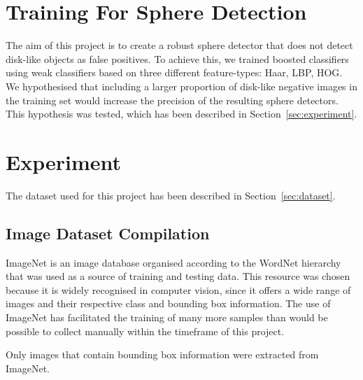 \documentclass{llncs}
\begin{document}
	\section{Training For Sphere Detection} {

		The aim of this project is to create a robust sphere detector that does not detect disk-like objects as false positives. To achieve this, we trained boosted classifiers using weak classifiers based on three different feature-types: Haar, LBP, HOG. We hypothesised that including a larger proportion of disk-like negative images in the training set would increase the precision of the resulting sphere detectors. This hypothesis was tested, which has been described in Section~\ref{sec:experiment}.

	}

	\section{Experiment} {
	\label{sec:experiment}


		The dataset used for this project has been described in Section~\ref{sec:dataset}.

		\subsection{Image Dataset Compilation} {
		\label{sec:dataset}


			ImageNet is an image database organised according to the WordNet hierarchy \citep{imagenet_cvpr09, fellbaum1998wordnet} that was used as a source of training and testing data. This resource was chosen because it is widely recognised in computer vision, since it offers a wide range of images and their respective class and bounding box information. The use of ImageNet has facilitated the training of many more samples than would be possible to collect manually within the timeframe of this project.


			Only images that contain bounding box information were extracted from ImageNet. 

}}
\end{document}
